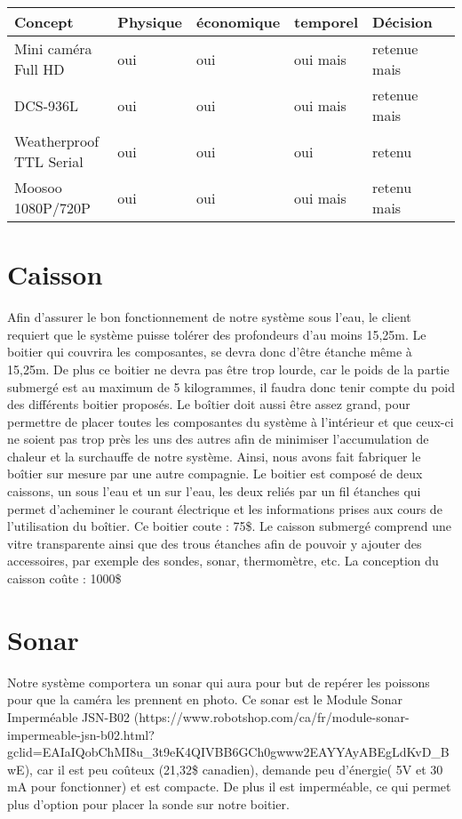	\begin{table}[H]
		\begin{tabular}{|l|l|l|l|l|l|}
			\hline
			Concept & Physique & économique & temporel & Décision \\ \hline
			Mini caméra Full HD & oui & oui & oui mais & retenue mais \\ \hline
			DCS-936L& oui & oui & oui mais & retenue mais \\ \hline
			Weatherproof TTL Serial&oui &oui &oui &retenu \\ \hline
			Moosoo 1080P/720P & oui& oui &oui mais & retenu mais \\ \hline
		\end{tabular}
	\end{table}
	\section{Caisson}
	Afin d’assurer le bon fonctionnement de notre système sous l’eau, le client requiert que le système puisse tolérer des profondeurs d’au moins 15,25m. Le boitier qui couvrira les composantes, se devra donc d’être étanche même à 15,25m. De plus ce boitier ne devra pas être trop lourde, car le poids de la partie submergé est au maximum de 5 kilogrammes, il faudra donc tenir compte du poid des différents boitier proposés. Le boîtier doit aussi être assez grand, pour permettre de placer toutes les composantes du système à l’intérieur et que ceux-ci ne soient pas trop près les uns des autres afin de minimiser l’accumulation de chaleur et la surchauffe de notre système. Ainsi, nous avons fait fabriquer le boîtier sur mesure par une autre compagnie. Le boitier est composé de deux caissons, un sous l’eau et un sur l’eau, les deux reliés par un fil étanches qui permet d’acheminer le courant électrique et les informations prises aux cours de l’utilisation du boîtier. Ce boitier coute : 75\$. Le caisson submergé comprend une vitre transparente ainsi que des trous étanches afin de pouvoir y ajouter des accessoires, par exemple des sondes, sonar, thermomètre, etc. La conception du caisson coûte : 1000\$
	
	\section{Sonar}
	Notre système comportera un sonar qui aura pour but de repérer les poissons pour que la caméra les prennent en photo. Ce sonar est le Module Sonar Imperméable JSN-B02 (https://www.robotshop.com/ca/fr/module-sonar-impermeable-jsn-b02.html?gclid=EAIaIQobChMI8u\_3t9eK4QIVBB6GCh0gwww2EAYYAyABEgLdKvD\_BwE), car il est peu coûteux (21,32\$ canadien), demande peu d’énergie( 5V et 30 mA pour fonctionner) et est compacte. De plus il est imperméable, ce qui permet plus d’option pour placer la sonde sur notre boitier.